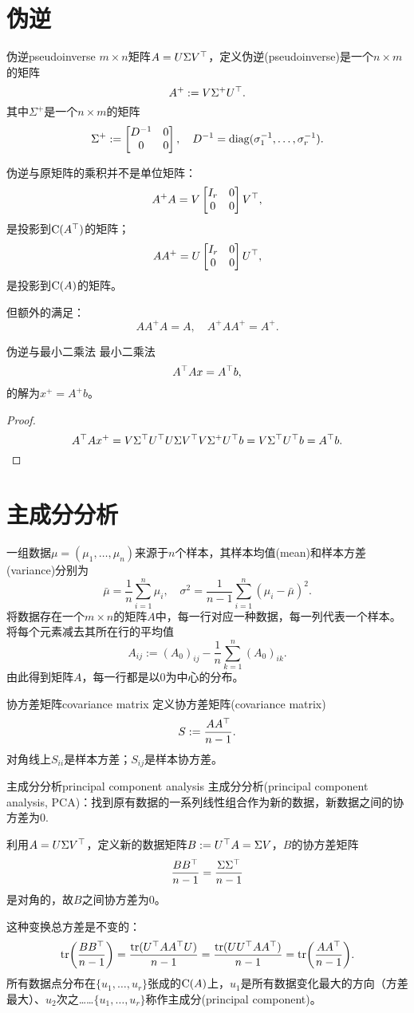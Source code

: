 \section{伪逆}
\begin{definition}{伪逆}{pseudoinverse}
	$m\times n$矩阵$A=U\Sigma V^\top$，定义伪逆(pseudoinverse)是一个$n\times m$的矩阵
	\begin{equation}
		A^+:=V\Sigma^+U^\top.
	\end{equation}
	其中$\Sigma^+$是一个$n\times m$的矩阵
	\[
		\Sigma^+:=\begin{bmatrix}
			D^{-1}&0\\0&0
		\end{bmatrix},\quad D^{-1}=\operatorname{diag}(\sigma_1^{-1},\ldots,\sigma_r^{-1}).
	\]
\end{definition}
伪逆与原矩阵的乘积并不是单位矩阵：
\[
	A^+A=V\begin{bmatrix}
		I_r&0\\0&0
	\end{bmatrix}V^\top,
\]
是投影到$\operatorname{C}(A^\top)$的矩阵；
\[
	AA^+=U\begin{bmatrix}
		I_r&0\\0&0
	\end{bmatrix}U^\top,
\]
是投影到$\operatorname{C}(A)$的矩阵。

但额外的满足：
\[
	AA^+A=A,\quad A^+AA^+=A^+.
\]
\begin{theorem}{伪逆与最小二乘法}{}
	最小二乘法
	\[
		A^\top Ax=A^\top b,
	\]
	的解为$x^+=A^+b$。
\end{theorem}
\begin{proof}
	
	\[
		A^\top Ax^+=V\Sigma^\top U^\top U\Sigma V^\top V\Sigma^+U^\top b=V\Sigma^\top U^\top b=A^\top b.
	\]
\end{proof}
\section{主成分分析}
一组数据$\mu=(\mu_1,\ldots,\mu_n)$来源于$n$个样本，其样本均值(mean)和样本方差(variance)分别为
\[
	\bar\mu=\frac1n\sum_{i=1}^n\mu_i,\quad\sigma^2=\frac1{n-1}\sum_{i=1}^n(\mu_i-\bar\mu)^2.
\]
将数据存在一个$m\times n$的矩阵$A$中，每一行对应一种数据，每一列代表一个样本。将每个元素减去其所在行的平均值
\[
	A_{ij}:=(A_0)_{ij}-\frac1n\sum_{k=1}^n(A_0)_{ik}.
\]
由此得到矩阵$A$，每一行都是以0为中心的分布。
\begin{definition}{协方差矩阵}{covariance matrix}
	定义协方差矩阵(covariance matrix)
	\begin{equation}
		S:=\frac{AA^\top}{n-1}.
	\end{equation}
	对角线上$S_{ii}$是样本方差；$S_{ij}$是样本协方差。
\end{definition}
\begin{method}{主成分分析}{principal component analysis}
	主成分分析(principal component analysis, PCA)：找到原有数据的一系列线性组合作为新的数据，新数据之间的协方差为0.
\end{method}
利用$A=U\Sigma V^\top$，定义新的数据矩阵$B:=U^\top A=\Sigma V$，$B$的协方差矩阵
\[
	\frac{BB^\top}{n-1}=\frac{\Sigma\Sigma^\top}{n-1}
\]
是对角的，故$B$之间协方差为0。

这种变换总方差是不变的：
\[
	\operatorname{tr}\biggl(\frac{BB^\top}{n-1}\biggr)=\frac{\operatorname{tr}(U^\top AA^\top U)}{n-1}=\frac{\operatorname{tr}(UU^\top AA^\top)}{n-1}=\operatorname{tr}\biggl(\frac{AA^\top}{n-1}\biggr).
\]
所有数据点分布在$\{u_1,\ldots,u_r\}$张成的$\operatorname{C}(A)$上，$u_1$是所有数据变化最大的方向（方差最大）、$u_2$次之……$\{u_1,\ldots,u_r\}$称作主成分(principal component)。
